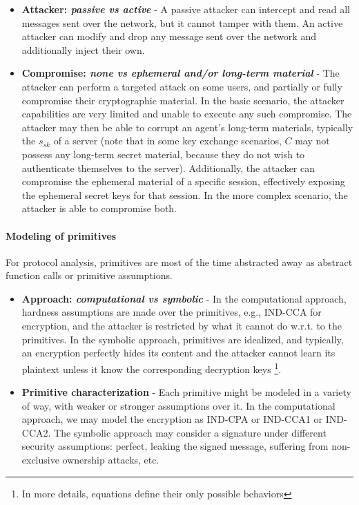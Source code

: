 \documentclass[11pt]{article}
\newcommand{\sfsk}{\mathit{sk}}
\begin{document}
\begin{itemize}
\item \textbf{Attacker: \emph{passive vs active}} - A passive attacker can intercept and read all messages sent over the network, but it cannot tamper with them. An active attacker can modify and drop any message sent over the network and additionally inject their own.
  \item \textbf{Compromise: \emph{none vs ephemeral and/or long-term material}} - The attacker can perform a targeted attack on some users, and partially or fully compromise their cryptographic material. In the basic scenario, the attacker capabilities are very limited and unable to execute any such compromise. 
  The attacker may then be able to corrupt an agent's long-term materials, typically the $s_\sfsk$ of a server (note that in some key exchange scenarios, $C$ may not possess any long-term secret material, because they do not wish to authenticate themselves to the server). Additionally, the attacker can compromise the ephemeral material of a specific session, effectively exposing the ephemeral secret keys for that session. In the more complex scenario, the attacker is able to compromise both.
 \end{itemize}

 \paragraph{Modeling of  primitives} For protocol analysis, primitives are most of the time abstracted away as abstract function calls or primitive assumptions.

 \begin{itemize}
 \item \textbf{Approach: \emph{computational vs symbolic}} - In the computational approach, hardness assumptions are made over the primitives, e.g., IND-CCA for encryption, and the attacker is restricted by what it cannot do w.r.t. to the primitives. In the symbolic approach, primitives are idealized, and typically, an encryption perfectly hides its content and the attacker cannot learn its plaintext unless it know the corresponding decryption keys \footnote{In more details, equations define their only possible behaviors}.
\item \textbf{Primitive characterization} - Each primitive might be modeled in a variety of way, with weaker or stronger assumptions over it. In the computational approach, we may model the encryption as IND-CPA or IND-CCA1 or IND-CCA2. The symbolic approach may consider a signature under different security assumptions: perfect, leaking the signed message, suffering from non-exclusive ownership attacks, etc.    
\end{itemize}
\end{document}
